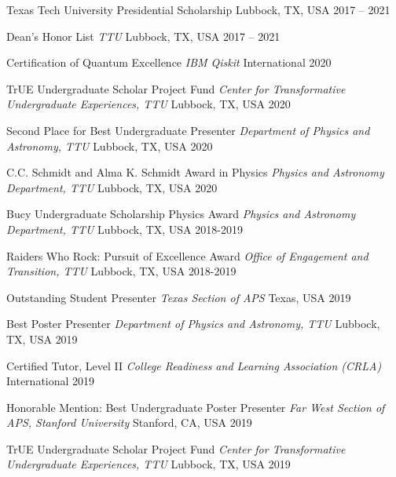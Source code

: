 

\begin{cvhonors}

    \cvhonor
    {Texas Tech University Presidential Scholarship}
    {}
    {Lubbock, TX, USA}
    {2017 -- 2021}

    \cvhonor
    {Dean's Honor List}
    {\textit{\scriptsize TTU}}
    {Lubbock, TX, USA}
    {2017 -- 2021}

    \cvhonor
    {Certification of Quantum Excellence}
    {\textit{\scriptsize IBM Qiskit}}
    {International}
    {2020}

    \cvhonor
    {TrUE Undergraduate Scholar Project Fund}
    {\textit{\scriptsize Center for Transformative Undergraduate Experiences, TTU}}
    {Lubbock, TX, USA}
    {2020}

    \cvhonor
    {Second Place for Best Undergraduate Presenter}
    {\textit{\scriptsize Department of Physics and Astronomy, TTU}}
    {Lubbock, TX, USA}
    {2020}

    \cvhonor
    {C.C. Schmidt and Alma K. Schmidt Award in Physics}
    {\textit{\scriptsize Physics and Astronomy Department, TTU}}
    {Lubbock, TX, USA}
    {2020}

    \cvhonor
    {Bucy Undergraduate Scholarship Physics Award}
    {\textit{\scriptsize Physics and Astronomy Department, TTU}}
    {Lubbock, TX, USA}
    {2018-2019}

    \cvhonor
    {Raiders Who Rock:  Pursuit of Excellence Award}
    {\textit{\scriptsize Office of Engagement and Transition, TTU}}
    {Lubbock, TX, USA}
    {2018-2019}

    \cvhonor
    {Outstanding Student Presenter}
    {\textit{\scriptsize Texas Section of APS}}
    {Texas, USA}
    {2019}

    \cvhonor
    {Best Poster Presenter}
    {\textit{\scriptsize Department of Physics and Astronomy, TTU}}
    {Lubbock, TX, USA}
    {2019}

    \cvhonor
    {Certified Tutor, Level II}
    {\textit{\scriptsize College Readiness and Learning Association (CRLA)}}
    {International}
    {2019}

    \cvhonor
    {Honorable Mention: Best Undergraduate Poster Presenter}
    {\textit{\scriptsize Far West Section of APS, Stanford University}}
    {Stanford, CA, USA}
    {2019}

    \cvhonor
    {TrUE Undergraduate Scholar Project Fund}
    {\textit{\scriptsize Center for Transformative Undergraduate Experiences, TTU}}
    {Lubbock, TX, USA}
    {2019}


\end{cvhonors}
